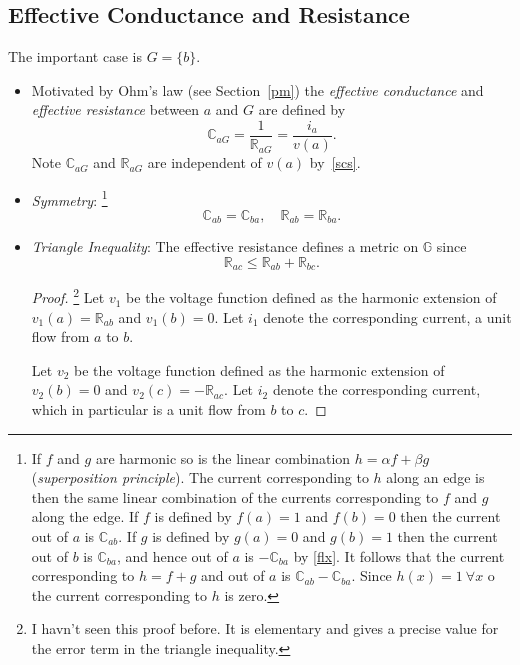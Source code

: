 \documentclass[a4paper]{amsart}
\theoremstyle{plain}
\theoremstyle{definition}
\theoremstyle{remark}
\begin{document}
\subsection{Effective Conductance and Resistance}  
The important case is $ G = \{ b \} $.
\begin{itemize} 
 \item Motivated by Ohm's law (see Section~\ref{pm})
the  \emph{effective conductance} and  \emph{effective resistance} between $ a $ and $ G $ are defined by
\begin{equation} \label{effr} 
 \mathbb{C}_{aG} = \frac{1}{\mathbb{R}_{aG}} = \frac{i_a}{v(a) }.
\end{equation} 
Note  $ \mathbb{C}_{aG} $ and  $ \mathbb{R}_{aG} $ are independent of $v(a) $ 
by~\eqref{scs}. 

\item \emph{Symmetry}:%
\footnote{\label{sp}If $ f $ and $ g $ are harmonic so is the linear combination $ h = \alpha f + \beta g $ (\emph{superposition principle}).
The current corresponding to $ h $ along an  edge is then the same linear combination of the currents corresponding to $ f $ and $ g $ along the edge.  If $ f $ is defined by $ f(a) = 1 $ and $ f(b)=0 $ then the current  out of $ a $ is $ \mathbb{C}_{ab} $.  If   $g $ is defined by $ g(a) = 0 $ and $g(b)=1 $ then the current out of $ b $ is $ \mathbb{C}_{ba} $, and  hence out of   $ a $ is $ -\mathbb{C}_{ba} $  by \eqref{flx}.  It follows that the current corresponding to $ h = f + g $ and out of $ a $ is  $ \mathbb{C}_{ab}- \mathbb{C}_{ba} $.  Since $ h(x) =1\ \forall x $ o the current corresponding to $ h $ is zero.}
 \[  \mathbb{C}_{ab} = \mathbb{C}_{ba}, \quad  \mathbb{R}_{ab} = \mathbb{R}_{ba}. \]
 
 \item \emph{Triangle Inequality}: The effective resistance defines a metric on $  \mathbb{G}  $ since 
 \begin{equation} \label{trii}
 \boxed{\mathbb{R}_{ac} \leq  \mathbb{R}_{ab} +  \mathbb{R}_{bc} .}
 \end{equation} 
 \begin{proof}%
 \footnote{I havn't seen this proof before.  It is elementary and gives a precise value for the error term in the triangle inequality.} 
 Let $v_1 $ be the voltage function defined as the harmonic extension of $ v_1(a) = \mathbb{R}_{ab} $ and $ v_1(b) = 0 $.   Let $ i_1 $ denote the corresponding current, a unit flow from $ a $ to $ b $. 
  
 Let $v_2 $ be the voltage function defined as the harmonic extension of $ v_2(b) = 0 $ and $ v_2(c) = -\mathbb{R}_{ac} $.   Let $ i_2 $ denote the corresponding current, which in particular is a unit flow from $ b $ to $ c $. 
  

\end{proof}
\end{itemize}
\end{document}
